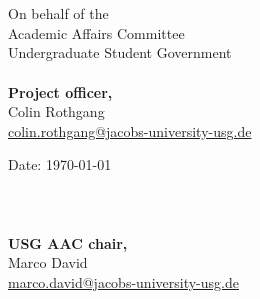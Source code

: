 \documentclass[a4paper,10pt]{article}
\makeatletter
\newcommand{\officer}[2]{#1\\\href{mailto:#2@jacobs-university-usg.de}{#2@jacobs-university-usg.de}}
\newcommand{\chair}{\officer{Marco David}{marco.david}}
\makeatother
\begin{document}
	\label{sec:dis}
	\tableofcontents
	
	
	\begin{appendices}
		
	\end{appendices}
	
	  \ \\\ \\
  \begin{minipage}{0.5\textwidth}
  	\begin{flushleft}
  		On behalf of the\\
  		Academic Affairs Committee\\
  		Undergraduate Student Government\\\ \\
  		\textbf{Project officer,}\\
  		\officer{Colin Rothgang}{colin.rothgang}
  	\end{flushleft}
  \end{minipage}
  \begin{minipage}{0.5\textwidth}
  	\begin{flushright}
  		Date: \today\\\ \\\ \\\ \\
  		\textbf{USG AAC chair,}\\
  		\chair
  	\end{flushright}
  \end{minipage}

	\label{theEnd}
\end{document}
